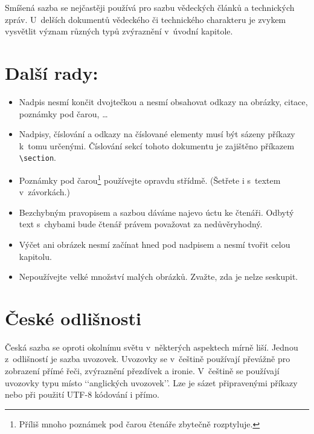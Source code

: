 \documentclass[a4paper, twocolumn, 10pt]{article}
\begin{document}
Smíšená sazba se nejčastěji používá pro sazbu vědeckých článků a technických zpráv.
U~delších dokumentů vědeckého či technického charakteru je zvykem
vysvětlit význam různých typů zvýraznění v~úvodní kapitole.

\section{Další rady:}
\label{sec:rady}

\begin{itemize}

	\item Nadpis nesmí končit dvojtečkou a nesmí obsahovat odkazy na obrázky, citace, poznámky pod čarou, \dots

	\item Nadpisy, číslování a odkazy na číslované elementy musí být sázeny příkazy k~tomu určenými.
	      Číslování sekcí tohoto dokumentu je zajištěno příkazem \verb|\section|.

	\item Poznámky pod čarou\footnote{Příliš mnoho poznámek pod čarou čtenáře zbytečně rozptyluje.}
	      používejte opravdu střídmě. (Šetřete i s~textem v~závorkách.)

	\item Bezchybným pravopisem a sazbou dáváme najevo úctu ke čtenáři.
	      Odbytý text s~chybami bude čtenář právem považovat za nedůvěryhodný.

	\item Výčet ani obrázek nesmí začínat hned pod nadpisem a nesmí tvořit celou kapitolu.

	\item Nepoužívejte velké množství malých obrázků.
	      Zvažte, zda je nelze seskupit.

\end{itemize}

\section{České odlišnosti}

Česká sazba se oproti okolnímu světu v~některých aspektech mírně liší.
Jednou z~odlišností je sazba uvozovek.
Uvozovky se v~češtině používají převážně pro zobrazení přímé řeči, zvýraznění přezdívek a ironie.
V~češtině se používají uvozovky typu  místo ‘‘anglických uvozovek’’.
Lze je sázet připravenými příkazy nebo při použití UTF-8 kódování i přímo.
\end{document}
